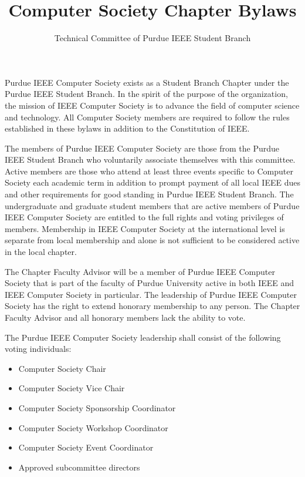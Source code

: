 \documentclass[12pt]{constitution}
\title{Computer Society Chapter Bylaws}
\author{Technical Committee of Purdue IEEE Student Branch}
\date{}
\begin{document}

\titlecontentspage
\newpage


\label{art:namepurp}

Purdue IEEE Computer Society exists as a Student Branch Chapter under the Purdue IEEE Student Branch. In the spirit of the purpose of the organization, the mission of IEEE Computer Society is to advance the field of computer science and technology. All Computer Society members are required to follow the rules established in these bylaws in addition to the Constitution of IEEE.


\label{art:member}

The members of Purdue IEEE Computer Society are those from the Purdue IEEE Student Branch who voluntarily associate themselves with this committee. Active members are those who attend at least three events specific to Computer Society each academic term in addition to prompt payment of all local IEEE dues and other requirements for good standing in Purdue IEEE Student Branch. The undergraduate and graduate student members that are active members of Purdue IEEE Computer Society are entitled to the full rights and voting privileges of members. Membership in IEEE Computer Society at the international level is separate from local membership and alone is not sufficient to be considered active in the local chapter.

The Chapter Faculty Advisor will be a member of Purdue IEEE Computer Society that is part of the faculty of Purdue University active in both IEEE and IEEE Computer Society in particular. The leadership of Purdue IEEE Computer Society has the right to extend honorary membership to any person. The Chapter Faculty Advisor and all honorary members lack the ability to vote.


\label{art:leader}

The Purdue IEEE Computer Society leadership shall consist of the following voting individuals:
\begin{itemize}
    \item Computer Society Chair
    \item Computer Society Vice Chair
    \item Computer Society Sponsorship Coordinator
    \item Computer Society Workshop Coordinator
    \item Computer Society Event Coordinator
    \item Approved subcommittee directors
\end{itemize}
\end{document}
